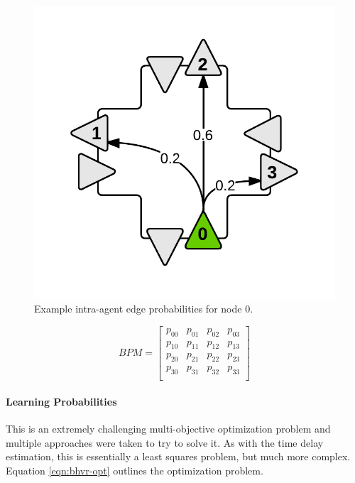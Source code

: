 \documentclass{report}
\begin{document}
\begin{figure}[H]
  \begin{centering}
    \includegraphics[scale=0.3]{figures/BPM-example.png}
    \caption{Example intra-agent edge probabilities for node 0.}
    \label{fig:BPM-example}
  \end{centering}
\end{figure}


\[
{BPM} =
    \begin{bmatrix}
    p_{00} & p_{01} & p_{02} & p_{03} \\
    p_{10} & p_{11} & p_{12} & p_{13} \\
p_{20} & p_{21} & p_{22} & p_{23} \\
p_{30} & p_{31} & p_{32} & p_{33} \\
    \end{bmatrix}
\]

\paragraph{Learning Probabilities}
This is an extremely challenging multi-objective optimization problem and multiple approaches were taken to try to solve it. 
As with the time delay estimation, this is essentially a least squares problem, but much more complex. Equation \eqref{eqn:bhvr-opt} outlines the optimization problem. 
\end{document}
